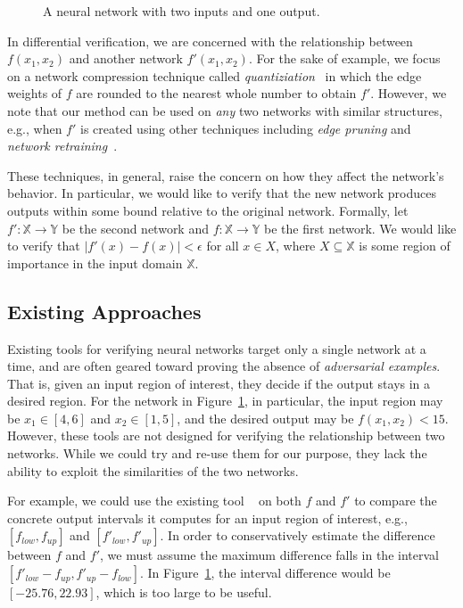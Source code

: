 \begin{figure}
	\centering
\scalebox{1.0}{}
\caption{A neural network with two inputs and one output.}
\label{fig:single-network}
\end{figure}


In differential verification, we are concerned with the relationship
between $f(x_1,x_2)$ and another network $f'(x_1,x_2)$.  For the sake
of example, we focus on a network compression technique
called \textit{quantiziation}~\cite{HanMD16} in which the edge weights
of $f$ are rounded to the nearest whole number to obtain $f'$.
However, we note that our method can be used on \textit{any} two
networks with similar structures, e.g., when $f'$ is created using
other techniques including \emph{edge pruning} and \emph{network
retraining}~\cite{HanMD16,HeLLWLH18,JulianKO18,SehwagWMJ19}.

These techniques, in general, raise the concern on how they affect the
network's behavior.  In particular, we would like to verify that the
new network produces outputs within some bound relative to the
original network.  Formally, let $ f' : \mathbb{X} \to \mathbb{Y} $ be
the second network and $ f : \mathbb{X} \to \mathbb{Y} $ be the first
network. We would like to verify that $ |f'(x) - f(x)| < \epsilon $
for all $ x \in X $, where $ X \subseteq \mathbb{X}$ is some region of
importance in the input domain $\mathbb{X}$.


\subsection{Existing Approaches}


Existing tools for verifying neural networks target only a single
network at a time, and are often geared toward proving the absence
of \textit{adversarial examples}.
%
That is, given an input region of interest, they decide if the output
stays in a desired region.  For the network in
Figure~\ref{fig:single-network}, in particular, the input region may
be $x_1\in[4,6]$ and $x_2\in [1,5]$, and the desired output
may be $f(x_1,x_2) < 15$.
%
However, these tools are not designed for verifying the relationship
between two networks.  While we could try and re-use them for our
purpose, they lack the ability to exploit the similarities of the two
networks.





For example, we could use the existing
tool \ReluVal{}~\cite{WangPWYJ18} on both $ f $ and $ f' $ to compare
the concrete output intervals it computes for an input region of
interest, e.g., $ [f_{low}, f_{up}] $ and $ [f'_{low}, f'_{up}]$.  In
order to conservatively estimate the difference between $ f $ and $ f'
$, we must assume the maximum difference falls in the interval $
[f'_{low} - f_{up}, f'_{up} - f_{low}] $.
%
In Figure~\ref{fig:single-network}, the interval difference would be
$[-25.76, 22.93]$, which is too large to be useful.



